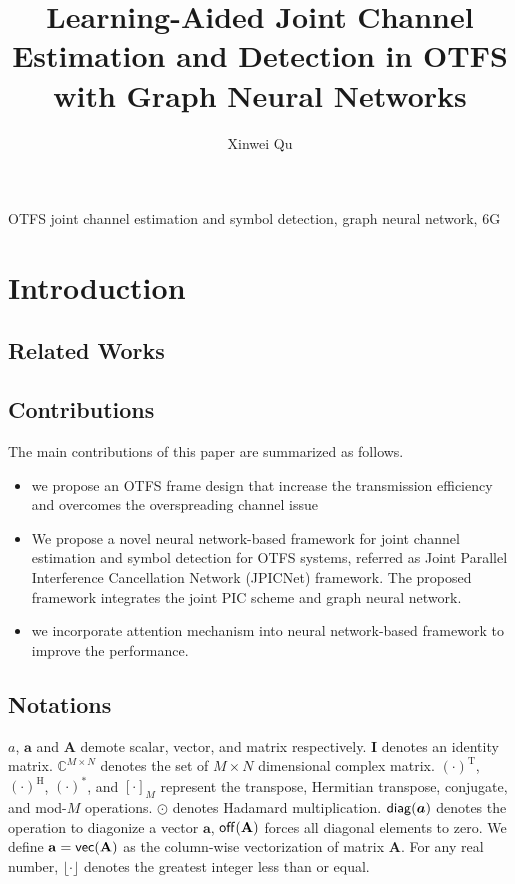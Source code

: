 \documentclass[journal]{IEEEtran}
\newcommand{\T}{^{\mathrm{T}}} %
\newcommand{\HT}{^{\mathrm{H}}} %
\newcommand{\diag}{{\sf diag}} %
\newcommand{\off}{{\sf off}} %
\newcommand{\vect}{{\sf vec}} %
\begin{document}
\title{Learning-Aided Joint Channel Estimation and Detection in OTFS with Graph Neural Networks}

\author{Xinwei Qu}

\maketitle

\begin{abstract}


\end{abstract}

\begin{IEEEkeywords}
OTFS joint channel estimation and symbol detection, graph neural network, 6G
\end{IEEEkeywords}

\section{Introduction}

\subsection{Related Works}

\subsection{Contributions}
The main contributions of this paper are summarized as follows.
\begin{itemize}
\item we propose an OTFS frame design that increase the transmission efficiency and overcomes the overspreading channel issue
\item We propose a novel neural network-based framework for joint channel estimation and symbol detection for OTFS systems, referred as Joint Parallel Interference Cancellation Network (JPICNet) framework. The proposed framework integrates the joint PIC scheme and graph neural network. 
\item we incorporate attention mechanism into neural network-based framework to improve the performance.
\end{itemize}

\subsection{Notations}
$a$, $\mathbf a$ and $\mathbf A$ demote scalar, vector, and matrix respectively. $\mathbf  I$ denotes an identity matrix. $\mathbb{C}^{M\times N}$ denotes the set of $M\times N$ dimensional complex matrix. $(\cdot)\T$, $(\cdot)\HT$, $(\cdot)^*$, and $[\cdot]_M$ represent the transpose, Hermitian transpose, conjugate, and mod-$M$ operations. $\odot$ denotes Hadamard multiplication. $\diag(\bm a)$ denotes the operation to diagonize a vector $\bm a$, $\off(\mathbf A)$ forces all diagonal elements to zero. We define $\mathbf a=\vect(\mathbf A)$ as the column-wise vectorization of matrix $\mathbf A$. For any real number, $\lfloor \cdot \rfloor$ denotes the greatest integer less than or equal.
\end{document}
